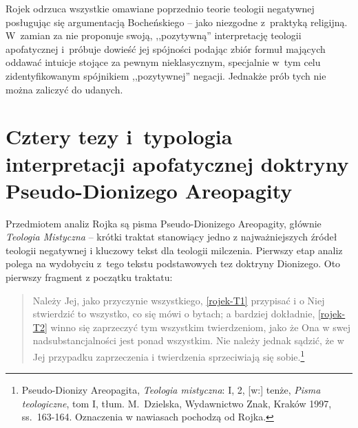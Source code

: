 Rojek odrzuca wszystkie omawiane poprzednio teorie teologii negatywnej posługując się argumentacją Bocheńskiego -- jako niezgodne z~praktyką religijną. W~zamian za nie proponuje swoją, ,,pozytywną'' interpretację teologii apofatycznej i~próbuje dowieść jej spójności podając zbiór formuł mających oddawać intuicje stojące za pewnym nieklasycznym, specjalnie w~tym celu zidentyfikowanym spójnikiem ,,pozytywnej'' negacji. Jednakże prób tych nie można zaliczyć do udanych.







\section{Cztery tezy i~typologia interpretacji apofatycznej doktryny Pseudo-Dionizego Areopagity}

Przedmiotem analiz Rojka są pisma Pseudo-Dionizego Areopagity, głównie
\textit{Teologia Mistyczna} -- krótki traktat stanowiący jedno z najważniejszych
źródeł teologii negatywnej i kluczowy tekst dla teologii milczenia.
Pierwszy etap analiz polega na wydobyciu z~tego tekstu podstawowych tez
doktryny Dionizego. Oto pierwszy fragment z początku traktatu:

\begin{quote}
    Należy Jej, jako przyczynie wszystkiego, \eqref{rojek-T1} przypisać i o Niej
stwierdzić to wszystko, co się mówi o bytach; a bardziej dokładnie,
\eqref{rojek-T2} winno się zaprzeczyć tym wszystkim twierdzeniom, jako że Ona w
swej nadsubstancjalności jest ponad wszystkim. Nie należy jednak
sądzić, że w Jej przypadku zaprzeczenia i twierdzenia sprzeciwiają się
sobie.\footnote{
Pseudo-Dionizy Areopagita, \textit{Teologia mistyczna}: I, 2, [w:] tenże, \textit{Pisma teologiczne}, tom I, tłum. M.~Dzielska, Wydawnictwo Znak, Kraków 1997, ss.~163-164.
Oznaczenia w nawiasach pochodzą od Rojka.}
\end{quote}





